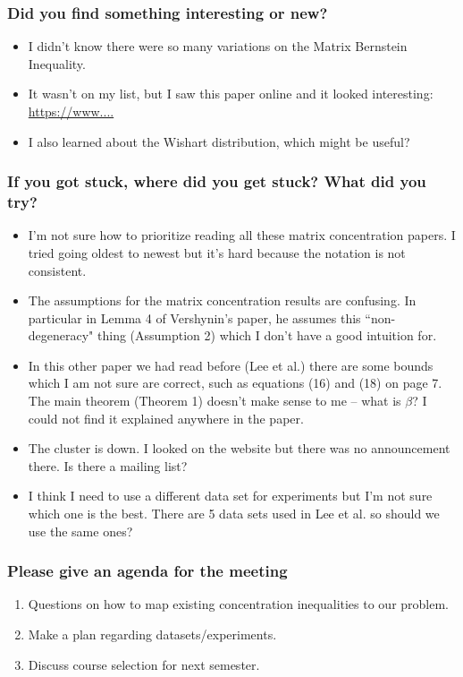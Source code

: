 \documentclass[10pt, letter]{article}
\begin{document}
\subsubsection*{Did you find something interesting or new?}  

\begin{note}
	\begin{itemize}
	\item I didn't know there were so many variations on the Matrix Bernstein Inequality.
	\item It wasn't on my list, but I saw this paper online and it looked interesting: \url{https://www....}
	\item I also learned about the Wishart distribution, which might be useful?
	\end{itemize}
\end{note}


\subsubsection*{If you got stuck, where did you get stuck? What did you try?}

\begin{note}
	\begin{itemize}
	\item I'm not sure how to prioritize reading all these matrix concentration papers. I tried going oldest to newest but it's hard because the notation is not consistent.
	\item The assumptions for the matrix concentration results are confusing.  In particular in Lemma 4 of Vershynin's paper, he assumes this ``non-degeneracy" thing (Assumption 2) which I don't have a good intuition for.
	\item In this other paper we had read before (Lee et al.) there are some bounds which I am not sure are correct, such as equations (16) and (18) on page 7.  The main theorem (Theorem 1) doesn't make sense to me -- what is $\beta$? I could not find it explained anywhere in the paper.
	\item The cluster is down. I looked on the website but there was no announcement there. Is there a mailing list?
	\item I think I need to use a different data set for experiments but I'm not sure which one is the best. There are 5 data sets used in Lee et al. so should we use the same ones?
	\end{itemize}
\end{note}


\subsubsection*{Please give an agenda for the meeting}

\begin{note}
	\begin{enumerate}
	\item Questions on how to map existing concentration inequalities to our problem.
	\item Make a plan regarding datasets/experiments. 
	\item Discuss course selection for next semester.
	\end{enumerate}
\end{note}
\end{document}
